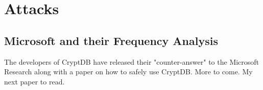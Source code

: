 \chapter{Attacks}
\label{chp:attacks}

\section{Microsoft and their Frequency Analysis}

The developers of CryptDB have released their "counter-answer" to the Microsoft Research along with a paper on how to safely use CryptDB. More to come. My next paper to read.


